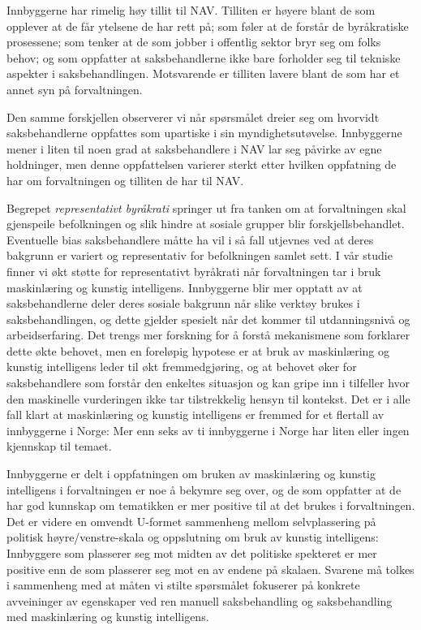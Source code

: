 \documentclass[
]{book}
\begin{document}
Innbyggerne har rimelig høy tillit til NAV.
Tilliten er høyere blant de som opplever at de får ytelsene de har rett på; som føler at de forstår de byråkratiske prosessene; som tenker at de som jobber i offentlig sektor bryr seg om folks behov; og som oppfatter at saksbehandlerne ikke bare forholder seg til tekniske aspekter i saksbehandlingen.
Motsvarende er tilliten lavere blant de som har et annet syn på forvaltningen.

Den samme forskjellen observerer vi når spørsmålet dreier seg om hvorvidt saksbehandlerne oppfattes som upartiske i sin myndighetsutøvelse.
Innbyggerne mener i liten til noen grad at saksbehandlere i NAV lar seg påvirke av egne holdninger, men denne oppfattelsen varierer sterkt etter hvilken oppfatning de har om forvaltningen og tilliten de har til NAV.

Begrepet \emph{representativt byråkrati} springer ut fra tanken om at forvaltningen skal gjenspeile befolkningen og slik hindre at sosiale grupper blir forskjellsbehandlet.
Eventuelle bias saksbehandlere måtte ha vil i så fall utjevnes ved at deres bakgrunn er variert og representativ for befolkningen samlet sett.
I vår studie finner vi økt støtte for representativt byråkrati når forvaltningen tar i bruk maskinlæring og kunstig intelligens.
Innbyggerne blir mer opptatt av at saksbehandlerne deler deres sosiale bakgrunn når slike verktøy brukes i saksbehandlingen, og dette gjelder spesielt når det kommer til utdanningsnivå og arbeidserfaring.
Det trengs mer forskning for å forstå mekanismene som forklarer dette økte behovet, men en foreløpig hypotese er at bruk av maskinlæring og kunstig intelligens leder til økt fremmedgjøring, og at behovet øker for saksbehandlere som forstår den enkeltes situasjon og kan gripe inn i tilfeller hvor den maskinelle vurderingen ikke tar tilstrekkelig hensyn til kontekst.
Det er i alle fall klart at maskinlæring og kunstig intelligens er fremmed for et flertall av innbyggerne i Norge:
Mer enn seks av ti innbyggerne i Norge har liten eller ingen kjennskap til temaet.

Innbyggerne er delt i oppfatningen om bruken av maskinlæring og kunstig intelligens i forvaltningen er noe å bekymre seg over, og de som oppfatter at de har god kunnskap om tematikken er mer positive til at det brukes i forvaltningen.
Det er videre en omvendt U-formet sammenheng mellom selvplassering på politisk høyre/venstre-skala og oppslutning om bruk av kunstig intelligens:
Innbyggere som plasserer seg mot midten av det politiske spekteret er mer positive enn de som plasserer seg mot en av endene på skalaen.
Svarene må tolkes i sammenheng med at måten vi stilte spørsmålet fokuserer på konkrete avveininger av egenskaper ved ren manuell saksbehandling og saksbehandling med maskinlæring og kunstig intelligens.
\end{document}

